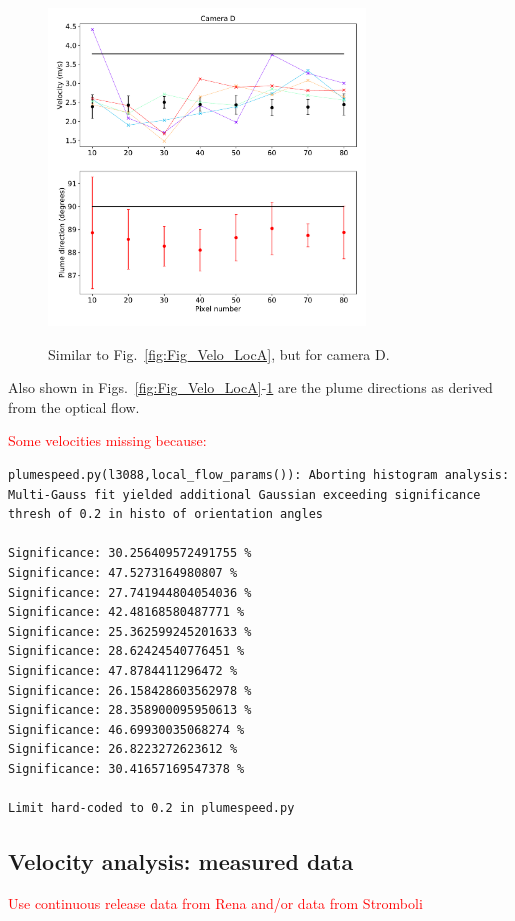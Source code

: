 \documentclass[amtd, manuscript]{copernicus}
\begin{document}
\begin{figure}[!htb]
  \begin{center}
    \includegraphics[width=0.75\textwidth]{Fig_Velo_LocV03_istep_all.pdf}\\
    \caption{\label{fig:Fig_Velo_LocV03_istep_all}
      Similar to Fig.~\ref{fig:Fig_Velo_LocA}, but for camera D.
    }
  \end{center}
\end{figure}
Also shown in
Figs.~\ref{fig:Fig_Velo_LocA}-\ref{fig:Fig_Velo_LocV03_istep_all} are
the plume directions as derived from the optical flow.

\textcolor{red}{
  Some velocities missing because:
  }
\begin{Verbatim}
plumespeed.py(l3088,local_flow_params()): Aborting histogram analysis:
Multi-Gauss fit yielded additional Gaussian exceeding significance
thresh of 0.2 in histo of orientation angles

Significance: 30.256409572491755 %
Significance: 47.5273164980807 %
Significance: 27.741944804054036 %
Significance: 42.48168580487771 %
Significance: 25.362599245201633 %
Significance: 28.62424540776451 %
Significance: 47.8784411296472 %
Significance: 26.158428603562978 %
Significance: 28.358900095950613 %
Significance: 46.69930035068274 %
Significance: 26.8223272623612 %
Significance: 30.41657169547378 %

Limit hard-coded to 0.2 in plumespeed.py

\end{Verbatim}



\subsection{Velocity analysis: measured data}
\textcolor{red}{Use continuous release data from Rena and/or data from
Stromboli}
\end{document}
